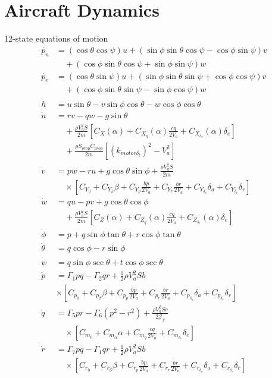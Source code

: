 \section{Aircraft Dynamics}
12-state equations of motion
\begin{align*}
\dot{p_n}&=(\cos\theta\cos\psi)u+(\sin\phi\sin\theta\cos\psi-\cos\phi\sin\psi)v\\
&\quad+(\cos\phi\sin\theta\cos\psi+\sin\phi\sin\psi)w \\
\dot{p_e}&=(\cos\theta\sin\psi)u+(\sin\phi\sin\theta\sin\psi+\cos\phi\cos\psi)v\\
&\quad+(\cos\phi\sin\theta\sin\psi-\sin\phi\cos\psi)w \\
\dot{h}&=u\sin\theta-v\sin\phi\cos\theta-w\cos\phi\cos\theta\\
\dot{u}&=rv-qw-g\sin\theta\\
&\quad+\frac{\rho V_a^2S}{2m}[C_X(\alpha)+C_{X_q}(\alpha)\frac{cq}{2V_a}+C_{X_{\delta_e}}(\alpha)\delta_e]\\
&\quad+\frac{\rho S_{prop}C_{prop}}{2m}[(k_{motor\delta_t})^2-V_a^2]\\
\dot{v}&=pw-ru+g\cos\theta\sin\phi+\frac{\rho V_a^2S}{2m} \\
&\quad\times[C_{Y_0}+C_{Y_\beta}\beta+C_{Y_p}\frac{bp}{2V_a}+C_{Y_r}\frac{br}{2V_a}+C_{Y_{\delta_a}}\delta_a+C_{Y_{\delta_r}}\delta_r]\\
\dot{w}&=qu-pv+g\cos\theta\cos\phi\\
&\quad+\frac{\rho V_a^2S}{2m}[C_Z(\alpha)+C_{Z_q}(\alpha)\frac{cq}{2V_a}+C_{Z_{\delta_e}}(\alpha)\delta_e]\\
\dot{\phi}&=p+q\sin\phi\tan\theta+r\cos\phi\tan\theta \\
\dot{\theta}&=q\cos\phi-r\sin\phi \\
\dot{\psi}&=q\sin\phi\sec\theta+t\cos\phi\sec\theta\\
\dot{p}&=\Gamma_1pq-\Gamma_2qr+\frac{1}{2}\rho V_a^2Sb \\
&\times[C_{p_0}+C_{p_\beta}\beta+C_{p_p}\frac{bp}{2V_a}+C_{p_r}\frac{br}{2V_a}+C_{p_{\delta_a}}\delta_a+C_{p_{\delta_r}}\delta_r]\\
\dot{q}&=\Gamma_5pr-\Gamma_6(p^2-r^2)+\frac{\rho V_a^2Sc}{2\mathcal{J}_y}\\
&\quad\times[C_{m_0}+C_{m_\alpha}\alpha+C_{m_q}\frac{cq}{2V_a}+C_{m_{\delta_e}}\delta_e]\\
\dot{r}&=\Gamma_7pq-\Gamma_1qr+\frac{1}{2}\rho V_a^2Sb\\
&\quad\times[C_{r_0}+C_{r_\beta}\beta+C_{r_p}\frac{bp}{2V_a}+C_{r_r}\frac{br}{2V_a}+C_{r_{\delta_a}}\delta_a+C_{r_{\delta_r}}\delta_r]
\end{align*}

